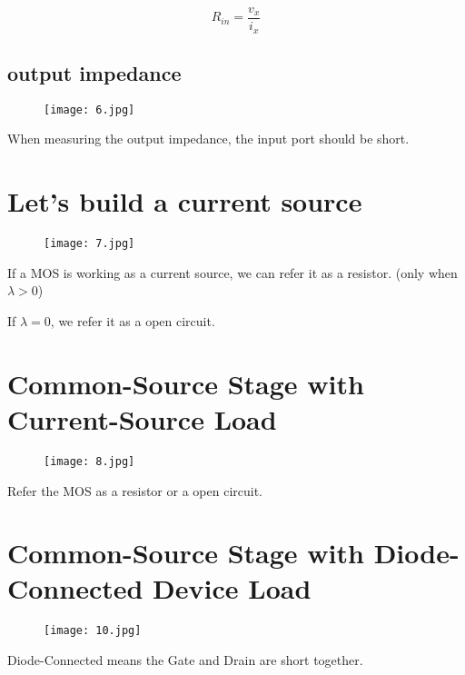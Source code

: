 \documentclass[fontset=windows]{article}
\begin{document}
$$R_{in}=\frac{v_x}{i_x}$$

\subsection*{output impedance}

\begin{figure}[htbp]
    \centering
    \texttt{[image: 6.jpg]}
    \captionsetup{labelformat=empty}
    \caption{}
    \label{6}
\end{figure}

When measuring the output impedance, the input port should be short. 

\section*{Let's build a current source}

\begin{figure}[htbp]
    \centering
    \texttt{[image: 7.jpg]}
    \captionsetup{labelformat=empty}
    \caption{}
    \label{7}
\end{figure}

If a MOS is working as a current source, we can refer it as a resistor. (only when $\lambda>0$) 

If $\lambda=0$, we refer it as a open circuit. 

\section*{Common-Source Stage with Current-Source Load}

\begin{figure}[htbp]
    \centering
    \texttt{[image: 8.jpg]}
    \captionsetup{labelformat=empty}
    \caption{}
    \label{8}
\end{figure}

Refer the MOS as a resistor or a open circuit. 

\section*{Common-Source Stage with Diode-Connected Device Load}

\begin{figure}[htbp]
    \centering
    \texttt{[image: 10.jpg]}
    \captionsetup{labelformat=empty}
    \caption{}
    \label{9}
\end{figure}

Diode-Connected means the Gate and Drain are short together. 
\end{document}
